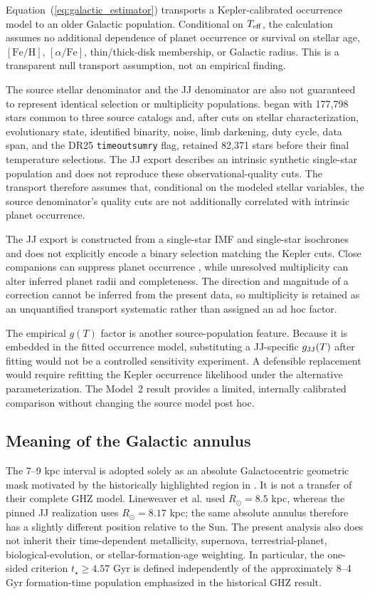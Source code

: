 Equation~(\ref{eq:galactic_estimator}) transports a Kepler-calibrated occurrence model to an older Galactic population. Conditional on $T_{\rm eff}$, the calculation assumes no additional dependence of planet occurrence or survival on stellar age, $[\mathrm{Fe/H}]$, $[\alpha/\mathrm{Fe}]$, thin/thick-disk membership, or Galactic radius. This is a transparent null transport assumption, not an empirical finding.

The source stellar denominator and the JJ denominator are also not guaranteed to represent identical selection or multiplicity populations. \citet{Bryson2021} began with 177,798 stars common to three source catalogs and, after cuts on stellar characterization, evolutionary state, identified binarity, noise, limb darkening, duty cycle, data span, and the DR25 \texttt{timeoutsumry} flag, retained 82,371 stars before their final temperature selections. The JJ export describes an intrinsic synthetic single-star population and does not reproduce these observational-quality cuts. The transport therefore assumes that, conditional on the modeled stellar variables, the source denominator's quality cuts are not additionally correlated with intrinsic planet occurrence.

The JJ export is constructed from a single-star IMF and single-star isochrones and does not explicitly encode a binary selection matching the Kepler cuts. Close companions can suppress planet occurrence \citep{Kraus2016}, while unresolved multiplicity can alter inferred planet radii and completeness. The direction and magnitude of a correction cannot be inferred from the present data, so multiplicity is retained as an unquantified transport systematic rather than assigned an ad hoc factor.

The empirical $g(T)$ factor is another source-population feature. Because it is embedded in the fitted occurrence model, substituting a JJ-specific $g_{\rm JJ}(T)$ after fitting would not be a controlled sensitivity experiment. A defensible replacement would require refitting the Kepler occurrence likelihood under the alternative parameterization. The Model~2 result provides a limited, internally calibrated comparison without changing the source model post hoc.

\subsection{Meaning of the Galactic annulus}

The 7--9 kpc interval is adopted solely as an absolute Galactocentric geometric mask motivated by the historically highlighted region in \citet{Lineweaver2004}. It is not a transfer of their complete GHZ model. Lineweaver et al. used $R_\odot=8.5$ kpc, whereas the pinned JJ realization uses $R_\odot=8.17$ kpc; the same absolute annulus therefore has a slightly different position relative to the Sun. The present analysis also does not inherit their time-dependent metallicity, supernova, terrestrial-planet, biological-evolution, or stellar-formation-age weighting. In particular, the one-sided criterion $t_\star\geq4.57$ Gyr is defined independently of the approximately 8--4 Gyr formation-time population emphasized in the historical GHZ result.


